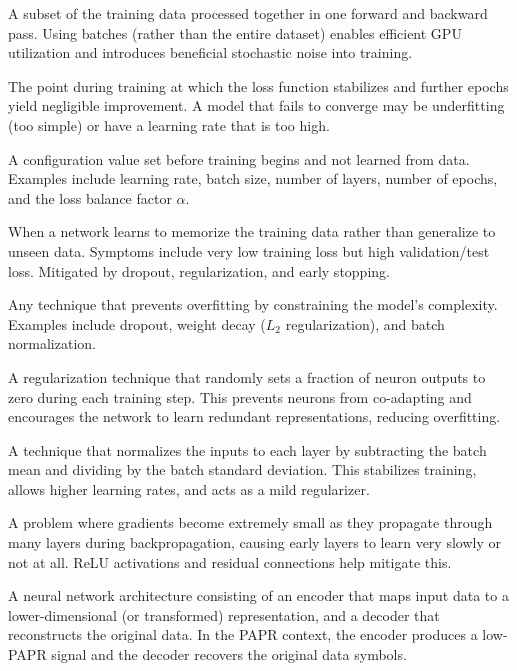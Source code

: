 \begin{description}[style=nextline, font=\normalfont\bfseries, leftmargin=1.5em]
      \item[Batch]
            A subset of the training data processed together in one forward and backward pass. Using batches (rather than the entire dataset) enables efficient GPU utilization and introduces beneficial stochastic noise into training.

      \item[Convergence]
            The point during training at which the loss function stabilizes and further epochs yield negligible improvement. A model that fails to converge may be underfitting (too simple) or have a learning rate that is too high.

      \item[Hyperparameter]
            A configuration value set before training begins and not learned from data. Examples include learning rate, batch size, number of layers, number of epochs, and the loss balance factor $\alpha$.

      \item[Overfitting]
            When a network learns to memorize the training data rather than generalize to unseen data. Symptoms include very low training loss but high validation/test loss. Mitigated by dropout, regularization, and early stopping.

      \item[Regularization]
            Any technique that prevents overfitting by constraining the model's complexity. Examples include dropout, weight decay ($L_2$ regularization), and batch normalization.

      \item[Dropout]
            A regularization technique that randomly sets a fraction of neuron outputs to zero during each training step. This prevents neurons from co-adapting and encourages the network to learn redundant representations, reducing overfitting.

      \item[Batch Normalization (BatchNorm)]
            A technique that normalizes the inputs to each layer by subtracting the batch mean and dividing by the batch standard deviation. This stabilizes training, allows higher learning rates, and acts as a mild regularizer.

      \item[Vanishing Gradients]
            A problem where gradients become extremely small as they propagate through many layers during backpropagation, causing early layers to learn very slowly or not at all. ReLU activations and residual connections help mitigate this.

      \item[Autoencoder]
            A neural network architecture consisting of an encoder that maps input data to a lower-dimensional (or transformed) representation, and a decoder that reconstructs the original data. In the PAPR context, the encoder produces a low-PAPR signal and the decoder recovers the original data symbols.

\end{description}
